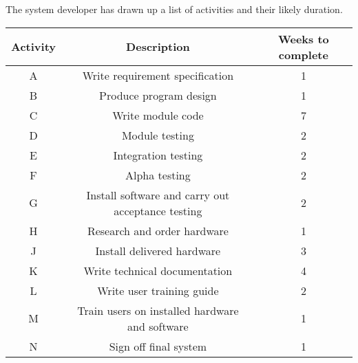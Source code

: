 The system developer has drawn up a list of activities and their likely
duration. 
\noindent \begin{center}
\begin{tabular}{|c|c|c|}
\hline 
\textbf{Activity} & \textbf{Description} & \textbf{Weeks to complete}\tabularnewline
\hline 
A & Write requirement specification & 1\tabularnewline
\hline 
B & Produce program design & 1\tabularnewline
\hline 
C & Write module code & 7\tabularnewline
\hline 
D & Module testing & 2\tabularnewline
\hline 
E & Integration testing & 2\tabularnewline
\hline 
F & Alpha testing & 2\tabularnewline
\hline 
G & Install software and carry out acceptance testing & 2\tabularnewline
\hline 
H & Research and order hardware & 1\tabularnewline
\hline 
J & Install delivered hardware & 3\tabularnewline
\hline 
K & Write technical documentation & 4\tabularnewline
\hline 
L & Write user training guide & 2\tabularnewline
\hline 
M & Train users on installed hardware and software & 1\tabularnewline
\hline 
N & Sign off final system & 1\tabularnewline
\hline 
\end{tabular}
\par\end{center}
